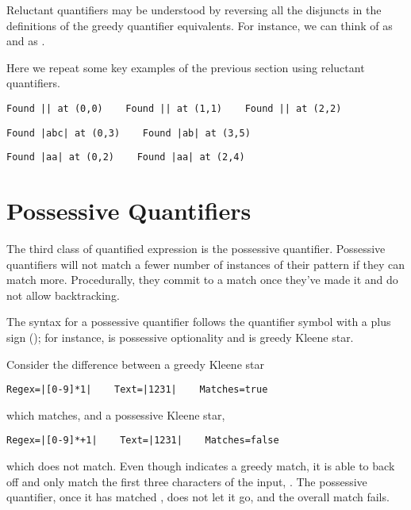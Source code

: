 Reluctant quantifiers may be understood by reversing all the disjuncts
in the definitions of the greedy quantifier equivalents.  For
instance, we can think of  as
 and  as
. 

Here we repeat some key examples of the previous section using reluctant
quantifiers.
%
\begin{verbatim}
Found || at (0,0)    Found || at (1,1)    Found || at (2,2)
\end{verbatim}
%
\begin{verbatim}
Found |abc| at (0,3)    Found |ab| at (3,5)
\end{verbatim}
%
\begin{verbatim}
Found |aa| at (0,2)    Found |aa| at (2,4)
\end{verbatim}
%


\section{Possessive Quantifiers}

The third class of quantified expression is the possessive quantifier.
Possessive quantifiers will not match a fewer number of instances of
their pattern if they can match more.  Procedurally, they commit to
a match once they've made it and do not allow backtracking.

The syntax for a possessive quantifier follows the quantifier symbol
with a plus sign (\code{+}); for instance,  is possessive
optionality and \code{*+} is greedy Kleene star.

Consider the difference between a greedy Kleene star
%
\begin{verbatim}
Regex=|[0-9]*1|    Text=|1231|    Matches=true
\end{verbatim}
%
which matches, and a possessive Kleene star,
%
\begin{verbatim}
Regex=|[0-9]*+1|    Text=|1231|    Matches=false
\end{verbatim}
%
which does not match.  Even though \code{[0-9]*} indicates a greedy
match, it is able to back off and only match the first three
characters of the input, .  The possessive quantifier, once
it has matched , does not let it go, and the overall match
fails.

